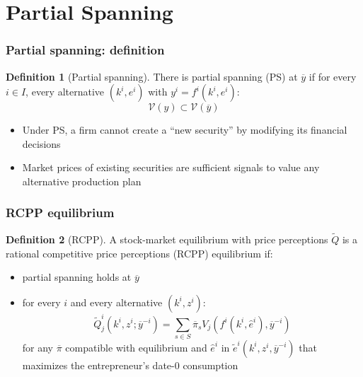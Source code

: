 \documentclass[blue]{beamer}
\theoremstyle{definition}
\theoremstyle{example}
\newtheorem*{definitionns}{Definition}
\begin{document}
\section{Partial Spanning}

\begin{frame}\frametitle{Partial spanning: definition}
\begin{definitionns}[Partial spanning]
There is \alert{partial spanning} (PS) at $\overline{y}$ if for every $i \in I$, every alternative $(k^i, e^i)$ with $y^i = f^i(k^i, e^i)$:
\begin{equation*}
\mathcal{V}(y) \subset \mathcal{V}(\overline{y})
\end{equation*}
\end{definitionns}
\bigskip

\begin{itemize}
\item Under PS, a firm cannot create a ``new security'' by modifying its financial decisions
\item Market prices of existing securities are sufficient signals to value any alternative production plan
\end{itemize}
\end{frame}

\begin{frame}\frametitle{RCPP equilibrium}
\begin{definitionns}[RCPP]
A stock-market equilibrium with price perceptions $\widetilde{Q}$ is a \alert{rational competitive price perceptions} (RCPP) equilibrium if:
\end{definitionns}

\begin{itemize}
\item[(i)] partial spanning holds at $\overline{y}$
\bigskip
\item[(ii)] for every $i$ and every alternative $(k^i, z^i)$:
\begin{equation*}
\widetilde{Q}^i_j(k^i, z^i; \overline{y}^{-i}) = \sum_{s \in S} \overline{\pi}_s V_j(f^i(k^i, \widehat{e}^i), \overline{y}^{-i})
\end{equation*}
for any $\overline{\pi}$ compatible with equilibrium and $\widehat{e}^i$ in $\widetilde{e}^i(k^i, z^i, \overline{y}^{-i})$ that maximizes the entrepreneur's date-$0$ consumption
\end{itemize}
\end{frame}
\end{document}
